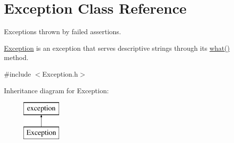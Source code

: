 \hypertarget{class_exception}{\section{Exception Class Reference}
\label{class_exception}
}


Exceptions thrown by failed assertions.

\hyperlink{class_exception}{Exception} is an exception that serves descriptive strings through its \hyperlink{class_exception_a45642915395d3b813fedc2593fbcb8bb}{what()} method.  




{\ttfamily \#include $<$Exception.\-h$>$}

Inheritance diagram for Exception\-:\begin{figure}[H]
\begin{center}
\leavevmode
\includegraphics[height=2.000000cm]{class_exception}
\end{center}
\end{figure}
